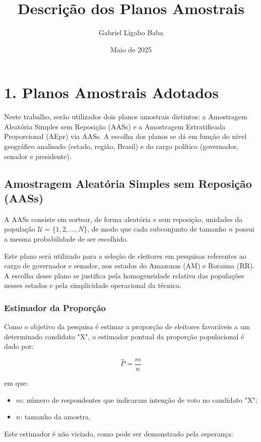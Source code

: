 \documentclass{article}
\title{Descrição dos Planos Amostrais}
\author{Gabriel Ligabo Baba}
\date{Maio de 2025}
\begin{document}
\maketitle

\section*{1. Planos Amostrais Adotados}

Neste trabalho, serão utilizados dois planos amostrais distintos: a Amostragem Aleatória Simples sem Reposição (AASs) e a Amostragem Estratificada Proporcional (AEpr) via AASs.
A escolha dos planos se dá em função do nível geográfico analisado (estado, região, Brasil) e do cargo político (governador, senador e presidente).

\subsection*{Amostragem Aleatória Simples sem Reposição (AASs)}

A AASs consiste em sortear, de forma aleatória e sem reposição, unidades da população $\mathcal{U} = \{1, 2, ..., N\}$, de modo que cada subconjunto de tamanho $n$ possui a mesma probabilidade de ser escolhido. 

Este plano será utilizado para a seleção de eleitores em pesquisas referentes ao cargo de governador e senador, nos estados do Amazonas (AM) e Roraima (RR). 
A escolha desse plano se justifica pela homogeneidade relativa das populações nesses estados e pela simplicidade operacional da técnica.

\subsubsection*{Estimador da Proporção}

Como o objetivo da pesquisa é estimar a proporção de eleitores favoráveis a um determinado candidato "X", o estimador pontual da proporção populacional é dado por:

\[
\hat{P} = \frac{m}{n}
\]

em que:
\begin{itemize}
    \item $m$: número de respondentes que indicaram intenção de voto no candidato "X";
    \item $n$: tamanho da amostra.
\end{itemize}

Este estimador é não viciado, como pode ser demonstrado pela esperança:
\end{document}
